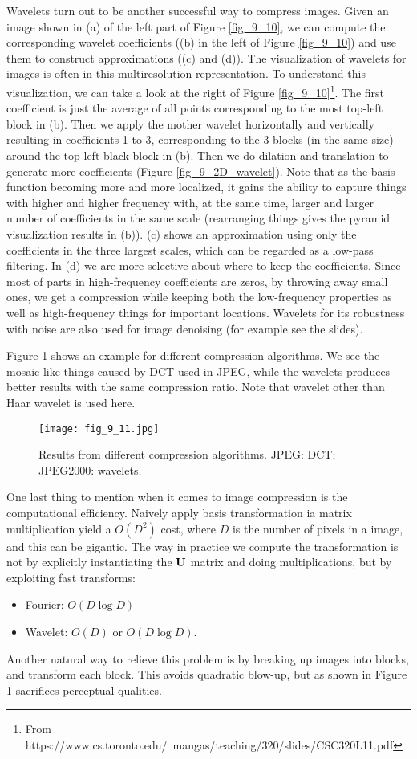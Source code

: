 \documentclass[../book-template.tex]{subfiles}
\begin{document}
\par Wavelets turn out to be another successful way to compress images. Given an image shown in (a) of the left part of Figure \ref{fig_9_10}, we can compute the corresponding wavelet coefficients ((b) in the left of Figure \ref{fig_9_10}) and use them to construct approximations ((c) and (d)). The visualization of wavelets for images is often in this multiresolution representation. To understand this visualization, we can take a look at the right of Figure \ref{fig_9_10}\footnote{From https://www.cs.toronto.edu/~mangas/teaching/320/slides/CSC320L11.pdf
}. The first coefficient is just the average of all points corresponding to the most top-left block in (b). Then we apply the mother wavelet horizontally and vertically resulting in coefficients 1 to 3, corresponding to the 3 blocks (in the same size) around the top-left black block in (b). Then we do dilation and translation to generate more coefficients (Figure \ref{fig_9_2D_wavelet}). Note that as the basis function becoming more and more localized, it gains the ability to capture things with higher and higher frequency with, at the same time, larger and larger number of coefficients in the same scale (rearranging things gives the pyramid visualization results in (b)). (c) shows an approximation using only the coefficients in the three largest scales, which can be regarded as a low-pass filtering. In (d) we are more selective about where to keep the coefficients. Since most of parts in high-frequency coefficients are zeros, by throwing away small ones, we get a compression while keeping both the low-frequency properties as well as high-frequency things for important locations. Wavelets for its robustness with noise are also used for image denoising (for example see the slides).
\par Figure \ref{fig_9_11} shows an example for different compression algorithms. We see the mosaic-like things caused by DCT used in JPEG, while the wavelets produces better results with the same compression ratio. Note that wavelet other than Haar wavelet is used here.
\begin{figure}[h] 
	\centering 
	\texttt{[image: fig\_9\_11.jpg]} 
	\caption{Results from different compression algorithms. JPEG: DCT; JPEG2000: wavelets.}\label{fig_9_11}
\end{figure}
One last thing to mention when it comes to image compression is the computational efficiency. Naively apply basis transformation ia matrix multiplication yield a $O(D^2)$ cost, where $D$ is the number of pixels in a image, and this can be gigantic. The way in practice we compute the transformation is not by explicitly instantiating the ${\bf U}$ matrix and doing multiplications, but by exploiting fast transforms:
\begin{itemize}
	\item Fourier: $O(D\log D)$
	\item Wavelet: $O(D)$ or $O(D\log D)$.
\end{itemize}
Another natural way to relieve this problem is by breaking up images into blocks, and transform each block. This avoids quadratic blow-up, but as shown in Figure \ref{fig_9_11} sacrifices perceptual qualities.
\end{document}
